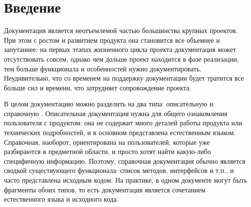 \documentclass[14pt]{matmex-diploma-custom}
\begin{document}

\maketitle
\tableofcontents
\setcounter{secnumdepth}{4}

\section*{Введение}
Документация является неотъемлемой частью большинства крупных проектов. При этом с ростом и развитием продукта она становится все объемнее и запутаннее: на первых этапах жизненного цикла проекта документация может отсутствовать совсем, однако чем дольше проект находится в фазе реализации, тем больше функционала и особенностей нужно документировать. Неудивительно, что со временем на поддержку документации будет тратится все больше сил и времени, что затрудняет сопровождение проекта.

В целом документацию можно разделить на два типа: описательную и справочную \cite{bib:art:DocumTypes}. Описательная документация нужна для общего ознакомления пользователя с продуктом: она не содержит много деталей работы продукта или технических подробностей, и в основном представлена естественным языком. Справочная, наоборот, ориентирована на пользователей, которые уже разбираются в предметной области, и просто хотят найти какую-либо специфичную информацию. Поэтому, справочная документация обычно является сводкой существующего функционала: список методов, интерфейсов и т.п., и часто представлена исходным кодом. На практике, в одном документе могут быть фрагменты обоих типов, то есть документация является сочетанием естественного языка и исходного кода.
\end{document}
